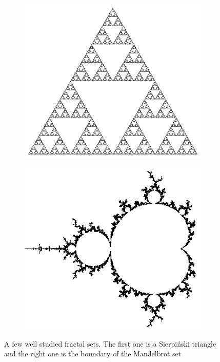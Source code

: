 \begin{figure}
\begin{subfigure}{.5\textwidth}
  \centering
  \includegraphics[width=.8\linewidth]{pics/intro/sierpinski.png}
  \label{fig:sfig1}
\end{subfigure}%
\begin{subfigure}{.5\textwidth}
  \centering
  \includegraphics[width=.8\linewidth]{pics/intro/Boundary_mandelbrot_set.png}
  \label{fig:sfig2}
\end{subfigure}
\caption{A few well studied fractal sets. The first one is a Sierpi\'nski triangle and the right one is the boundary of the Mandelbrot set}
\label{fig:examples1}
\end{figure}




